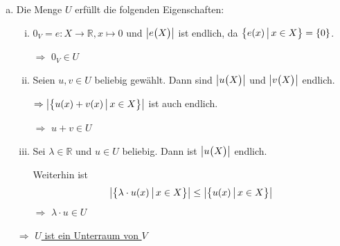 \documentclass{scrreprt}
\begin{document}
\begin{enumerate}[(a)]
\item Die Menge $U$ erfüllt die folgenden Eigenschaften:
  \begin{enumerate}[(i)]
  \item  $0_V = e \colon X \to \mathbb{R}, x \mapsto 0$ und
    $\abs{e\qty\big(X)}$ ist endlich, da
    $\qty\big{e(x) \,{\big |}\, x \in X} = \qty{0}$.

    $\Rightarrow$ \underline{$0_V \in U$}

  \item Seien $u, v \in U$ beliebig gewählt.
    Dann sind $\abs{u\qty\big(X)}$ und $\abs{v\qty\big(X)}$ endlich.

    $\Rightarrow \abs{\qty\big{u(x) + v(x) \,{\big |}\, x \in X}}$ ist
    auch endlich.

    $\Rightarrow$ \underline{$u + v \in U$}

  \item Sei $\lambda \in \mathbb{R}$ und $u \in U$ beliebig.
    Dann ist $\abs{u\qty\big(X)}$ endlich.

    Weiterhin ist
    \[
      \abs{\qty\big{\lambda \cdot u(x) \,{\big |}\, x \in X}} \leq
      \abs{\qty\big{u(x) \,{\big |}\, x \in X}}
    \]
    $\Rightarrow$ \underline{$\lambda \cdot u \in U$}
  \end{enumerate}
  $\Rightarrow$ \underline{$U$ ist ein Unterraum von $V$}
\end{enumerate}
\end{document}
